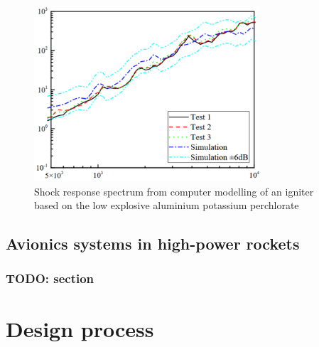 \documentclass[a4paper,11pt]{article}
\begin{document}
\begin{figure}[H]
  \centering
  \includegraphics[width=0.75\textwidth]{images/deflagration.png}
  \caption{Shock response spectrum from computer modelling of an igniter based on the low explosive aluminium potassium perchlorate \cite{wang2023numerical}}
  \label{fig:lowsrs}
\end{figure}



\subsection{Avionics systems in high-power rockets}

\subsubsection{TODO: section}




\section{Design process}
\end{document}
